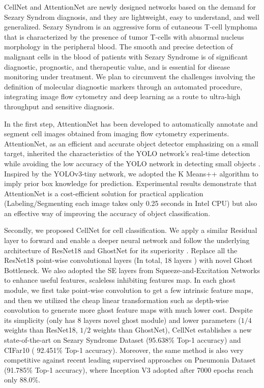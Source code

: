 {CellNet and AttentionNet are newly designed networks based on the demand for Sezary Syndrom diagnosis, and they are lightweight, easy to understand, and well generalized. Sezary Syndrom is an aggressive form of cutaneous T-cell lymphoma that is characterized by the presence of tumor T-cells with abnormal nucleus morphology in the peripheral blood. The smooth and precise detection of malignant cells in the blood of patients with Sezary Syndrome is of significant diagnostic, prognostic, and therapeutic value, and is essential for disease monitoring under treatment\cite{6}\cite{7}. We plan to circumvent the challenges involving the definition of molecular diagnostic markers through an automated procedure, integrating image flow cytometry and deep learning as a route to ultra-high throughput and sensitive diagnosis.

In the first step, AttentionNet has been developed to automatically annotate and segment cell images obtained from imaging flow cytometry experiments. AttentionNet, as an efficient and accurate object detector emphasizing on a small target, inherited the characteristics of the YOLO network's real-time detection while avoiding the low accuracy of the YOLO network in detecting small objects \cite{33}. Inspired by the YOLOv3-tiny network\cite{18}, we adopted the K Means++ algorithm to imply prior box knowledge for prediction. Experimental results demonstrate that AttentionNet is a cost-efficient solution for practical application (Labeling/Segmenting each image takes only 0.25 seconds in Intel CPU) but also an effective way of improving the accuracy of object classification. 

Secondly, we proposed CellNet for cell classification. We apply a similar Residual layer to forward and enable a deeper neural network and follow the underlying architecture of ResNet18 and GhostNet for its superiority \cite{19}\cite{20}. Replace all the ResNet18 \cite{20} point-wise convolutional layers (In total, 18 layers ) with novel Ghost Bottleneck. We also adopted the SE layers from Squeeze-and-Excitation Networks \cite{24} to enhance useful features, scaleless inhibiting features map. In each ghost module, we first take point-wise convolution to get a few intrinsic feature maps, and then we utilized the cheap linear transformation such as depth-wise convolution to generate more ghost feature maps with much lower cost.
Despite its simplicity (only has 8 layers novel ghost module) and lower parameters ($1/4$ weights than ResNet18\cite{20}, $1/2$ weights than GhostNet\cite{19}), CellNet establishes a new state-of-the-art on Sezary Syndrome Dataset (95.638\% Top-1 accuracy) and CIFar10\cite{21} ( 92.451\% Top-1 accuracy). Moreover, the same method is also very competitive against recent leading supervised approaches on Pneumonia Dataset (91.785\% Top-1 accuracy), where Inception V3 adopted after 7000 epochs reach only 88.0\%\cite{38}. 

}
